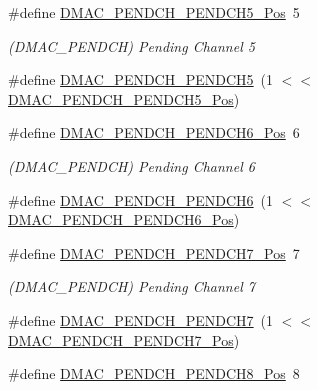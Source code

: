 \begin{DoxyCompactItemize}
\item 
\#define \mbox{\hyperlink{group___s_a_m_d21___d_m_a_c_gae2c9f572251f601c26e61dbaf9f37c7a}{D\+M\+A\+C\+\_\+\+P\+E\+N\+D\+C\+H\+\_\+\+P\+E\+N\+D\+C\+H5\+\_\+\+Pos}}~5
\begin{DoxyCompactList}\small\item\em (D\+M\+A\+C\+\_\+\+P\+E\+N\+D\+CH) Pending Channel 5 \end{DoxyCompactList}\item 
\#define \mbox{\hyperlink{group___s_a_m_d21___d_m_a_c_gacd4ae2ca3c16f78b9c2072a471cc2984}{D\+M\+A\+C\+\_\+\+P\+E\+N\+D\+C\+H\+\_\+\+P\+E\+N\+D\+C\+H5}}~(1 $<$$<$ \mbox{\hyperlink{group___s_a_m_d21___d_m_a_c_gae2c9f572251f601c26e61dbaf9f37c7a}{D\+M\+A\+C\+\_\+\+P\+E\+N\+D\+C\+H\+\_\+\+P\+E\+N\+D\+C\+H5\+\_\+\+Pos}})
\item 
\#define \mbox{\hyperlink{group___s_a_m_d21___d_m_a_c_gac3de4830918d0bf57e86c410ca90196c}{D\+M\+A\+C\+\_\+\+P\+E\+N\+D\+C\+H\+\_\+\+P\+E\+N\+D\+C\+H6\+\_\+\+Pos}}~6
\begin{DoxyCompactList}\small\item\em (D\+M\+A\+C\+\_\+\+P\+E\+N\+D\+CH) Pending Channel 6 \end{DoxyCompactList}\item 
\#define \mbox{\hyperlink{group___s_a_m_d21___d_m_a_c_gab7fe6bc7d0a87a3ab75500a098118310}{D\+M\+A\+C\+\_\+\+P\+E\+N\+D\+C\+H\+\_\+\+P\+E\+N\+D\+C\+H6}}~(1 $<$$<$ \mbox{\hyperlink{group___s_a_m_d21___d_m_a_c_gac3de4830918d0bf57e86c410ca90196c}{D\+M\+A\+C\+\_\+\+P\+E\+N\+D\+C\+H\+\_\+\+P\+E\+N\+D\+C\+H6\+\_\+\+Pos}})
\item 
\#define \mbox{\hyperlink{group___s_a_m_d21___d_m_a_c_ga4e2438bf80fb8dc8d57ed90da53723a5}{D\+M\+A\+C\+\_\+\+P\+E\+N\+D\+C\+H\+\_\+\+P\+E\+N\+D\+C\+H7\+\_\+\+Pos}}~7
\begin{DoxyCompactList}\small\item\em (D\+M\+A\+C\+\_\+\+P\+E\+N\+D\+CH) Pending Channel 7 \end{DoxyCompactList}\item 
\#define \mbox{\hyperlink{group___s_a_m_d21___d_m_a_c_ga111f396ea3ea6f83c34cf3a720c0d5d8}{D\+M\+A\+C\+\_\+\+P\+E\+N\+D\+C\+H\+\_\+\+P\+E\+N\+D\+C\+H7}}~(1 $<$$<$ \mbox{\hyperlink{group___s_a_m_d21___d_m_a_c_ga4e2438bf80fb8dc8d57ed90da53723a5}{D\+M\+A\+C\+\_\+\+P\+E\+N\+D\+C\+H\+\_\+\+P\+E\+N\+D\+C\+H7\+\_\+\+Pos}})
\item 
\#define \mbox{\hyperlink{group___s_a_m_d21___d_m_a_c_ga907776d2406a117c2e64b3520493d30c}{D\+M\+A\+C\+\_\+\+P\+E\+N\+D\+C\+H\+\_\+\+P\+E\+N\+D\+C\+H8\+\_\+\+Pos}}~8
$$
\end{DoxyCompactItemize}
